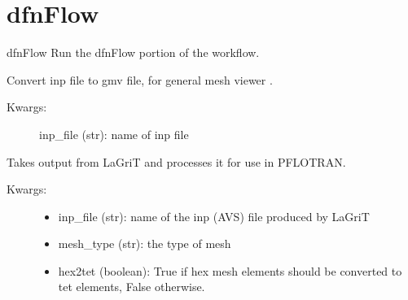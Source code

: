 \documentclass[letterpaper,10pt,english]{sphinxmanual}
\begin{document}
\section{dfnFlow}
\label{\detokenize{pydfnworks:module-pydfnworks.flow}}\label{\detokenize{pydfnworks:dfnflow}}

\begin{fulllineitems}
\label{\detokenize{pydfnworks:pydfnworks.flow.dfn_flow}}
dfnFlow
Run the dfnFlow portion of the workflow.

\end{fulllineitems}


\begin{fulllineitems}
\label{\detokenize{pydfnworks:pydfnworks.flow.inp2gmv}}
Convert inp file to gmv file, for general mesh viewer .
\begin{description}
\item[{Kwargs:}] \leavevmode
inp\_file (str): name of inp file

\end{description}

\end{fulllineitems}


\begin{fulllineitems}
\label{\detokenize{pydfnworks:pydfnworks.flow.lagrit2pflotran}}
Takes output from LaGriT and processes it for use in PFLOTRAN.
\begin{description}
\item[{Kwargs:}] \leavevmode\begin{itemize}
\item {} 
inp\_file (str): name of the inp (AVS) file produced by LaGriT

\item {} 
mesh\_type (str): the type of mesh

\item {} 
hex2tet (boolean): True if hex mesh elements should be converted to tet elements, False otherwise.

\end{itemize}

\end{description}

\end{fulllineitems}
\end{document}
